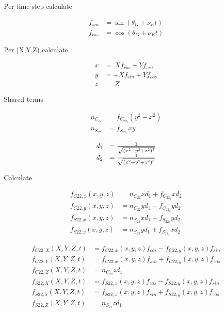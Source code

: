 \documentclass{article}
\begin{document}
Per time step calculate

\begin{equation}
\begin{array}{ll}
f_{sin} &= \sin(\theta_G+\nu_Et) \\
f_{cos} &= \cos(\theta_G+\nu_Et)
\end{array}
\end{equation}

Per (X,Y,Z) calculate

\begin{equation}
\begin{array}{ll}
x&=~Xf_{cos}+Yf_{sin} \\
y&=-Xf_{sin}+Yf_{cos} \\
z&=~Z
\end{array}
\end{equation}

Shared terms

\begin{equation}
\begin{array}{ll}
n_{C_{22}} &= f_{C_{22_1}}(y^2-x^2) \\
n_{S_{22}} &= f_{S_{22_1}}xy
\end{array}
\end{equation}

\begin{equation}
\begin{array}{ll}
d_1 &= {1 \over \sqrt{(x^2+y^2+z^2)^7}} \\
d_2 &= {1 \over \sqrt{(x^2+y^2+z^2)^5}}
\end{array}
\end{equation}

Calculate

\begin{equation}
\begin{array}{ll}
f_{C22,x}(x,y,z) &= n_{C_{22}}xd_1 + f_{C_{22_2}}xd_2 \\
f_{C22,y}(x,y,z) &= n_{C_{22}}yd_1 - f_{C_{22_2}}yd_2 \\
f_{S22,x}(x,y,z) &= n_{S_{22}}xd_1 + f_{S_{22_2}}yd_2 \\
f_{S22,y}(x,y,z) &= n_{S_{22}}yd_1 + f_{S_{22_2}}xd_2
\end{array}
\end{equation}

\begin{equation}
\begin{array}{ll}
f_{C22,X}(X,Y,Z,t) &= f_{C22,x}(x,y,z)f_{cos} - f_{C22,y}(x,y,z)f_{sin} \\
f_{C22,Y}(X,Y,Z,t) &= f_{C22,x}(x,y,z)f_{sin} + f_{C22,y}(x,y,z)f_{cos} \\
f_{C22,Z}(X,Y,Z,t) &= n_{C_{22}}zd_1 \\
f_{S22,X}(X,Y,Z,t) &= f_{S22,x}(x,y,z)f_{cos} - f_{S22,y}(x,y,z)f_{sin} \\
f_{S22,Y}(X,Y,Z,t) &= f_{S22,x}(x,y,z)f_{sin} + f_{S22,y}(x,y,z)f_{cos} \\
f_{S22,Z}(X,Y,Z,t) &= n_{S_{22}}zd_1
\end{array}
\end{equation}
\end{document}

